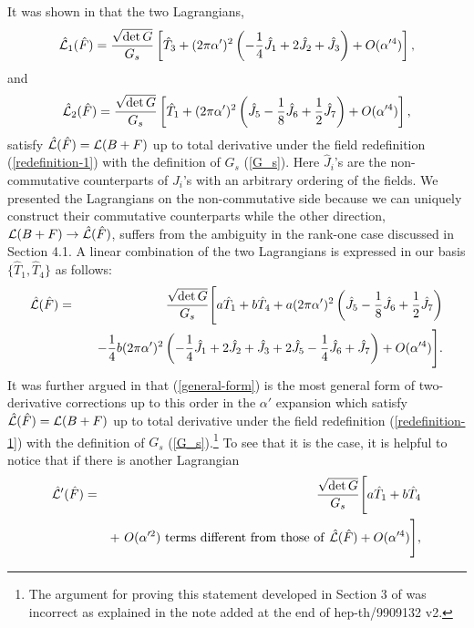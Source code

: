 \documentclass[a4paper,12pt]{article}
\begin{document}
It was shown in \cite{Okawa} that the two Lagrangians,
\begin{equation}
\hat{{\cal L}}_1 (\hat{F}) =
\frac{\sqrt{\det G}}{G_s} \left[
\hat{T}_3 + (2 \pi \alpha')^2
\left( -\frac{1}{4} \hat{J}_1 + 2 \hat{J}_2 + \hat{J}_3
\right) + O(\alpha'^4)
\right],
\end{equation}
and
\begin{equation}
\hat{{\cal L}}_2 (\hat{F}) =
\frac{\sqrt{\det G}}{G_s} \left[
\hat{T}_1 + (2 \pi \alpha')^2
\left( \hat{J}_5 -\frac{1}{8} \hat{J}_6 + \frac{1}{2} \hat{J}_7
\right) + O(\alpha'^4)
\right],
\end{equation}
satisfy $\hat{{\cal L}} (\hat{F}) = {\cal L} (B+F)$
up to total derivative under the field redefinition
(\ref{redefinition-1}) with the definition of $G_s$ (\ref{G_s}).
Here $\hat{J}_i$'s are the non-commutative counterparts of
$J_i$'s with an arbitrary ordering of the fields.
We presented the Lagrangians on the non-commutative side
because we can uniquely construct their commutative counterparts
while the other direction,
${\cal L} (B+F) \to \hat{{\cal L}} (\hat{F})$, suffers from
the ambiguity in the rank-one case discussed in Section 4.1.
A linear combination of the two Lagrangians is expressed
in our basis $\{ \hat{T}_1, \hat{T}_4 \}$ as follows:
\begin{eqnarray}
\hat{{\cal L}} (\hat{F}) &=&
\frac{\sqrt{\det G}}{G_s} \Biggl[
a \hat{T}_1 + b \hat{T}_4
+ a (2 \pi \alpha')^2
\left( \hat{J}_5 -\frac{1}{8} \hat{J}_6 + \frac{1}{2} \hat{J}_7
\right)
\nonumber \\
&& \quad
- \frac{1}{4} b (2 \pi \alpha')^2
\left( -\frac{1}{4} \hat{J}_1 + 2 \hat{J}_2 + \hat{J}_3
+2 \hat{J}_5 -\frac{1}{4} \hat{J}_6 + \hat{J}_7
\right) + O(\alpha'^4) \Biggr].
\label{general-form}
\end{eqnarray}
It was further argued in \cite{Okawa} that
(\ref{general-form}) is the most general form
of two-derivative corrections
up to this order in the $\alpha'$ expansion
which satisfy
$\hat{{\cal L}} (\hat{F}) = {\cal L} (B+F)$
up to total derivative under the field redefinition
(\ref{redefinition-1})
with the definition of $G_s$ (\ref{G_s}).\footnote{
The argument for proving this statement
developed in Section 3 of \cite{Okawa}
was incorrect as explained in the note added
at the end of hep-th/9909132 v2.
}
To see that it is the case, it is helpful to notice that
if there is another Lagrangian
\begin{eqnarray}
\hat{{\cal L}}' (\hat{F}) &=&
\frac{\sqrt{\det G}}{G_s} \Biggl[
a \hat{T}_1 + b \hat{T}_4
\nonumber \\
&& + ~O(\alpha'^2) {\rm~terms~different~from~those~of~}
\hat{{\cal L}} (\hat{F})
+ O(\alpha'^4) \Biggr],
\end{eqnarray}
\end{document}
